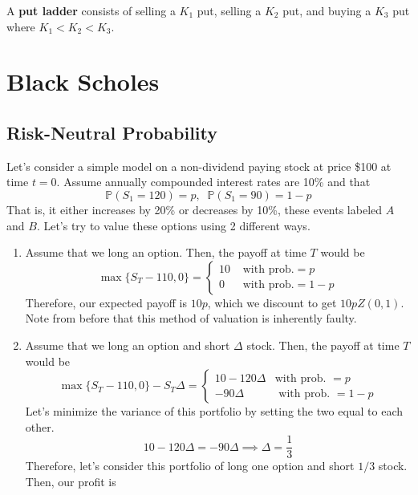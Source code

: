 \documentclass{article}
\begin{document}
    \begin{definition}
      A \textbf{put ladder} consists of selling a $K_1$ put, selling a $K_2$ put, and buying a $K_3$ put where $K_1 < K_2 < K_3$. 
    \end{definition}

\section{Black Scholes}

  \subsection{Risk-Neutral Probability}

    Let's consider a simple model on a non-dividend paying stock at price \$100 at time $t = 0$. Assume annually compounded interest rates are 10\% and that 
    \begin{equation}
      \mathbb{P}(S_1 = 120) = p, \;\; \mathbb{P}(S_1 = 90) = 1 - p
    \end{equation}
    That is, it either increases by 20\% or decreases by 10\%, these events labeled $A$ and $B$. Let's try to value these options using 2 different ways. 
    \begin{enumerate}
      \item Assume that we long an option. Then, the payoff at time $T$ would be 
        \begin{equation}
          \max\{S_T - 110, 0\} = \begin{cases}
            10 & \text{ with prob.} = p \\ 
            0 & \text{ with prob.} = 1 - p 
          \end{cases} 
        \end{equation}
        Therefore, our expected payoff is $10p$, which we discount to get $10p Z(0, 1)$. Note from before that this method of valuation is inherently faulty. 

      \item Assume that we long an option and short $\Delta$ stock. Then, the payoff at time $T$ would be 
        \begin{equation}
          \max\{S_T - 110, 0\} - S_T \Delta = \begin{cases} 
            10 - 120 \Delta & \text{with prob. } = p  \\ 
            - 90\Delta & \text{ with prob. } = 1 - p
          \end{cases} 
        \end{equation}
        Let's minimize the variance of this portfolio by setting the two equal to each other. 
        \begin{equation}
          10 - 120 \Delta = -90 \Delta \implies \Delta = \frac{1}{3}
        \end{equation}
        Therefore, let's consider this portfolio of long one option and short $1/3$ stock. Then, our profit is 
    \end{enumerate}
\end{document}
